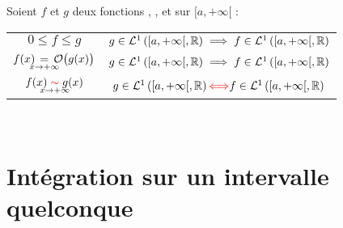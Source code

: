 \documentclass[11pt,a4paper,fleqn,pdftex]{report}
\begin{document}
\begin{itheorem}
    \label{thm:relations_de_comparaison_fonction_positive}
     Soient $f$ et $g$ deux fonctions , , et  sur $[a,+\infty [$ : 
     \\[0.4\baselineskip]
     \begin{tabular}{@{si }c@{, \qquad}c }
         $0\le f \le g$&$g \in \mathcal{L}^1\left( [a,+\infty [,\mathbb{R}{}\right)\implies f \in \mathcal{L}^1\left( [a,+\infty [,\mathbb{R}{}\right)$ \\[6mm]
             $f(x) \, \underset{\mathclap{x\to +\infty}}{=} \, \mathcal{O}\big( g(x)\big)$& $g \in \mathcal{L}^1\left( [a,+\infty [,\mathbb{R}{}\right)\implies f \in \mathcal{L}^1\left( [a,+\infty [,\mathbb{R}{}\right)$\\[6mm]
                 $f(x) \;\underset{\mathclap{x\to +\infty}}{\textcolor{couleurImp}{\sim}}\; g(x)$&$g \in \mathcal{L}^1\left( [a,+\infty [,\Reel{}\right)\textcolor{couleurImp}{\Longleftrightarrow} f \in \mathcal{L}^1\left( [a,+\infty [,\Reel{}\right)$
     \end{tabular}\\
\end{itheorem}
\section{Intégration sur un intervalle quelconque} %
\label{sec:integration_intervalle_quelconque}
\end{document}
